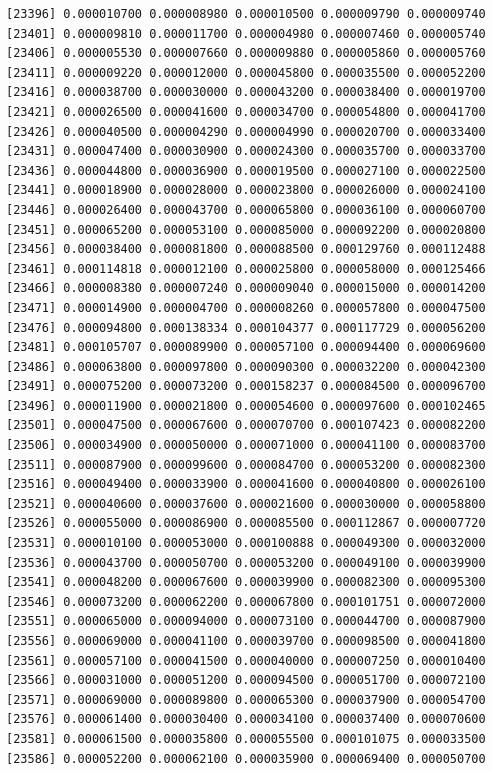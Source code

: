 \documentclass[]{article}
\begin{document}
\begin{verbatim}
[23396] 0.000010700 0.000008980 0.000010500 0.000009790 0.000009740
[23401] 0.000009810 0.000011700 0.000004980 0.000007460 0.000005740
[23406] 0.000005530 0.000007660 0.000009880 0.000005860 0.000005760
[23411] 0.000009220 0.000012000 0.000045800 0.000035500 0.000052200
[23416] 0.000038700 0.000030000 0.000043200 0.000038400 0.000019700
[23421] 0.000026500 0.000041600 0.000034700 0.000054800 0.000041700
[23426] 0.000040500 0.000004290 0.000004990 0.000020700 0.000033400
[23431] 0.000047400 0.000030900 0.000024300 0.000035700 0.000033700
[23436] 0.000044800 0.000036900 0.000019500 0.000027100 0.000022500
[23441] 0.000018900 0.000028000 0.000023800 0.000026000 0.000024100
[23446] 0.000026400 0.000043700 0.000065800 0.000036100 0.000060700
[23451] 0.000065200 0.000053100 0.000085000 0.000092200 0.000020800
[23456] 0.000038400 0.000081800 0.000088500 0.000129760 0.000112488
[23461] 0.000114818 0.000012100 0.000025800 0.000058000 0.000125466
[23466] 0.000008380 0.000007240 0.000009040 0.000015000 0.000014200
[23471] 0.000014900 0.000004700 0.000008260 0.000057800 0.000047500
[23476] 0.000094800 0.000138334 0.000104377 0.000117729 0.000056200
[23481] 0.000105707 0.000089900 0.000057100 0.000094400 0.000069600
[23486] 0.000063800 0.000097800 0.000090300 0.000032200 0.000042300
[23491] 0.000075200 0.000073200 0.000158237 0.000084500 0.000096700
[23496] 0.000011900 0.000021800 0.000054600 0.000097600 0.000102465
[23501] 0.000047500 0.000067600 0.000070700 0.000107423 0.000082200
[23506] 0.000034900 0.000050000 0.000071000 0.000041100 0.000083700
[23511] 0.000087900 0.000099600 0.000084700 0.000053200 0.000082300
[23516] 0.000049400 0.000033900 0.000041600 0.000040800 0.000026100
[23521] 0.000040600 0.000037600 0.000021600 0.000030000 0.000058800
[23526] 0.000055000 0.000086900 0.000085500 0.000112867 0.000007720
[23531] 0.000010100 0.000053000 0.000100888 0.000049300 0.000032000
[23536] 0.000043700 0.000050700 0.000053200 0.000049100 0.000039900
[23541] 0.000048200 0.000067600 0.000039900 0.000082300 0.000095300
[23546] 0.000073200 0.000062200 0.000067800 0.000101751 0.000072000
[23551] 0.000065000 0.000094000 0.000073100 0.000044700 0.000087900
[23556] 0.000069000 0.000041100 0.000039700 0.000098500 0.000041800
[23561] 0.000057100 0.000041500 0.000040000 0.000007250 0.000010400
[23566] 0.000031000 0.000051200 0.000094500 0.000051700 0.000072100
[23571] 0.000069000 0.000089800 0.000065300 0.000037900 0.000054700
[23576] 0.000061400 0.000030400 0.000034100 0.000037400 0.000070600
[23581] 0.000061500 0.000035800 0.000055500 0.000101075 0.000033500
[23586] 0.000052200 0.000062100 0.000035900 0.000069400 0.000050700

\end{verbatim}
\end{document}
